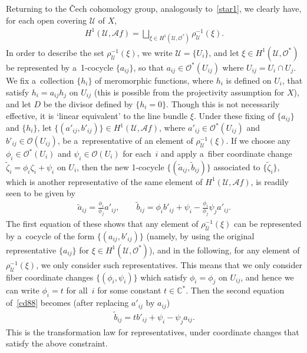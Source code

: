 \documentclass[pdftex]{sigma}
\numberwithin{equation}{section}
\begin{document}
Returning to the \v Cech cohomology group, analogously to~\eqref{star1}, we clearly have, for each open covering
$\mathscr U$ of $X$,
\begin{gather*}%
H^1 (\mathscr U,\mathscr Af) = \bigsqcup_{\xi \in H^1(\mathscr U,\mathscr O^*)}\rho_{\mathscr U}^{-1}(\xi).
\end{gather*}
In order to describe the set $\rho_{\mathscr U}^{-1}(\xi)$, we write $\mathscr U = \{U_i\}$, and let $\xi\in
H^1(\mathscr U,\mathscr O^*)$ be represented by a~1-cocycle $\{a_{ij}\}$, so that $a_{ij}\in \mathscr O^*(U_{ij})$ where
$U_{ij}=U_i\cap U_j$.
We f\/ix a~collection $\{h_i\}$ of meromorphic functions, where $h_i$ is def\/ined on $U_i$, that satisfy $h_i = a_{ij}
h_j$ on $U_{ij}$ (this is possible from the projectivity assumption for $X$), and let $D$ be the divisor def\/ined by
$\{h_i = 0\}$.
Though this is not necessarily ef\/fective, it is `linear equivalent' to the line bundle $\xi$.
Under these f\/ixing of $\{a_{ij}\}$ and $\{h_i\}$, let $\{(a'_{ij},b'_{ij})\}\in H^1(\mathscr U,\mathscr Af)$, where
$a'_{ij}\in\mathscr O^*(U_{ij})$ and $b'_{ij}\in \mathscr O(U_{ij})$, be a~representative of an element of
$\rho_{\mathscr U}^{-1}(\xi)$.
If we choose any $\phi_i\in \mathscr O^*(U_i)$ and $\psi_i\in \mathscr O(U_i)$ for each~$i$ and apply a~f\/iber
coordinate change $\tilde{\zeta}_i= \phi_i\zeta_i + \psi_i$ on $U_i$, then the new 1-cocycle $\{(\tilde a_{ij},\tilde
b_{ij})\}$ associated to $\{\tilde{\zeta}_i\}$, which is another representative of the same element of $H^1(\mathscr
U,\mathscr Af)$, is readily seen to be given by
\begin{gather}
\label{cd88}
\tilde a_{ij} = \frac{\phi_i}{\phi_j}a'_{ij},
\qquad
\tilde b_{ij} = \phi_i b'_{ij} + \psi_i - \frac{\phi_i}{\phi_j}\psi_j a'_{ij}.
\end{gather}
The f\/irst equation of these shows that any element of $\rho_{\mathscr U}^{-1} (\xi)$ can be represented by a~cocycle
of the form $\{(a_{ij},b'_{ij})\}$ (namely, by using the original representative $\{a_{ij}\}$ for $\xi\in H^1(\mathscr
U,\mathscr O^*)$), and in the following, for any element of $\rho_{\mathscr U}^{-1} (\xi)$, we only consider such
representatives.
This means that we only consider f\/iber coordinate changes $\{(\phi_i,\psi_i)\}$ which satisfy $\phi_i = \phi_j$ on
$U_{ij}$, and hence we can write $\phi_i = t$ for all~$i$ for some constant $t\in \mathbb{C}^*$.
Then the second equation of~\eqref{cd88} becomes (after replacing $a'_{ij}$ by $a_{ij}$)
\begin{gather}
\label{cc89}
\tilde b_{ij} = t b'_{ij} + \psi_i -\psi_j a_{ij}.
\end{gather}
This is the transformation law for representatives, under coordinate changes that satisfy the above constraint.
\end{document}
